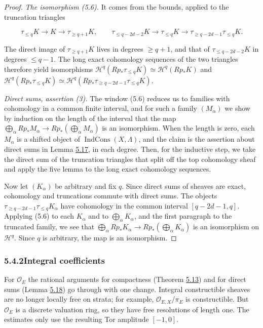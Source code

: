 \documentclass[11pt]{article}
\providecommand{\IndCons}{}\renewcommand{\IndCons}{\operatorname{IndCons}}
\begin{document}
\begin{proof}[{Proof}]
\emph{The isomorphism (5.6).} It comes from the bounds, applied to the truncation triangles

\[
\tau_{\leq q}K\to K\to\tau_{\geq q+1}K,
\qquad
\tau_{\leq q-2d-2}K\to\tau_{\leq q}K\to\tau_{\geq q-2d-1}\tau_{\leq q}K.
\]

The direct image of \(\tau_{\geq q+1}K\) lives in degrees \(\geq q+1\), and that of \(\tau_{\leq q-2d-2}K\) in degrees \(\leq q-1\). The long exact cohomology sequences of the two triangles therefore yield isomorphisms \(\mathcal H^q(Rp_*\tau_{\leq q}K)\simeq\mathcal H^q(Rp_*K)\) and \(\mathcal H^q(Rp_*\tau_{\leq q}K)\simeq
\mathcal H^q(Rp_*\tau_{\geq q-2d-1}\tau_{\leq q}K)\).

\emph{Direct sums, assertion (3).} The window (5.6) reduces us to families with cohomology in a common finite interval, and for such a family \((M_\alpha)\) we show by induction on the length of the interval that the map \(\bigoplus_\alpha Rp_*M_\alpha\to Rp_*(\bigoplus_\alpha M_\alpha)\) is an isomorphism. When the length is zero, each \(M_\alpha\) is a shifted object of \(\IndCons(X,\Lambda)\), and the claim is the assertion about direct sums in Lemma \hyperref[bp57]{5.17}, in each degree. Then, for the inductive step, we take the direct sum of the truncation triangles that split off the top cohomology sheaf and apply the five lemma to the long exact cohomology sequences.

Now let \((K_\alpha)\) be arbitrary and fix \(q\). Since direct sums of sheaves are exact, cohomology and truncations commute with direct sums. The objects \(\tau_{\geq q-2d-1}\tau_{\leq q}K_\alpha\) have cohomology in the common interval \([q-2d-1,q]\). Applying (5.6) to each \(K_\alpha\) and to \(\bigoplus_\alpha K_\alpha\), and the first paragraph to the truncated family, we see that \(\bigoplus_\alpha Rp_*K_\alpha\to Rp_*(\bigoplus_\alpha K_\alpha)\) is an isomorphism on \(\mathcal H^q\). Since \(q\) is arbitrary, the map is an isomorphism.
\end{proof}


\subsubsection*{\texorpdfstring{5.4.2\quad Integral coefficients}{5.4.2 Integral coefficients}}
\label{bp63}%
\label{bp64}%
For \(\mathcal O_E\) the rational arguments for compactness (Theorem \hyperref[bp40]{5.13}) and for direct sums (Lemma \hyperref[bp61]{5.18}) go through with one change. Integral constructible sheaves are no longer locally free on strata; for example, \(\mathcal O_{E,X}/\pi_E\) is constructible. But \(\mathcal O_E\) is a discrete valuation ring, so they have free resolutions of length one. The estimates only use the resulting Tor amplitude \([-1,0]\).
\end{document}
